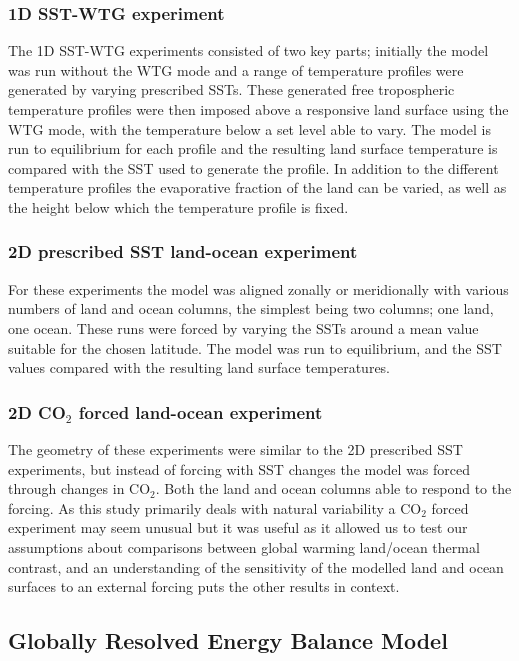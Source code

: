 \subsubsection{1D SST-WTG experiment}
The 1D SST-WTG experiments consisted of two key parts; initially the model was 
run without the WTG mode and a range of temperature profiles were generated by 
varying prescribed SSTs. These generated free tropospheric temperature profiles 
were then imposed above a responsive land surface using the WTG mode, with the 
temperature below a set level able to vary. The model is run to equilibrium for 
each profile and the resulting land surface temperature is compared with the SST 
used to generate the profile.  In addition to the different temperature profiles 
the evaporative fraction of the land can be varied, as well as the height below 
which the temperature profile is fixed.

\subsubsection{2D prescribed SST land-ocean experiment}
For these experiments the model was aligned zonally or meridionally with various 
numbers of land and ocean columns, the simplest being two columns; one land, one 
ocean. These runs were forced by varying the SSTs around a mean value suitable 
for the chosen latitude. The model was run to equilibrium, and the SST values 
compared with the resulting land surface temperatures.

\subsubsection{2D CO$_2$ forced land-ocean experiment}
The geometry of these experiments were similar to the 2D prescribed SST 
experiments, but instead of forcing with SST changes the model was forced 
through changes in CO$_2$. Both the land and ocean columns able to respond to 
the forcing. As this study primarily deals with natural variability a CO$_2$ 
forced experiment may seem unusual but it was useful as it allowed us to test 
our assumptions about comparisons between global warming land/ocean thermal 
contrast, and an understanding of the sensitivity of the modelled land and ocean 
surfaces to an external forcing puts the other results in context.



\subsection{Globally Resolved Energy Balance Model}

